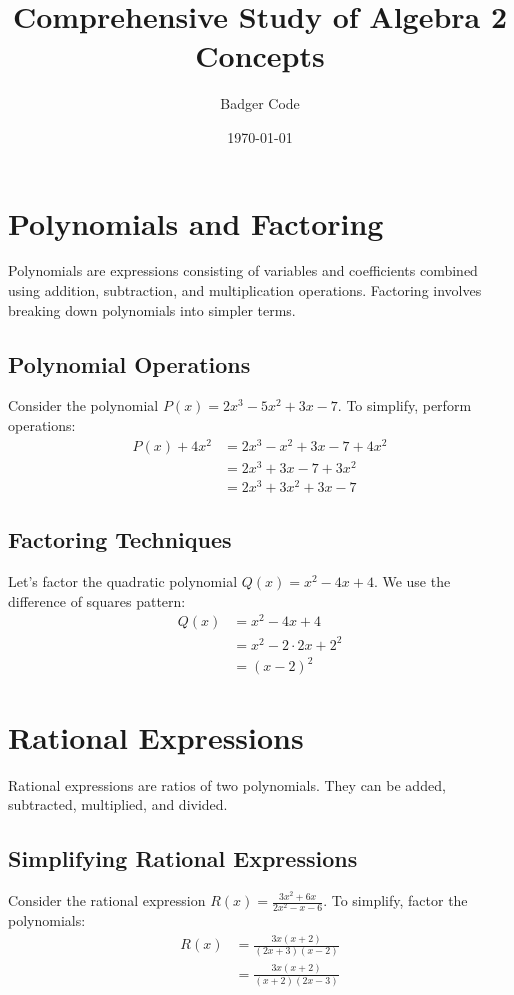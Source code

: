 \documentclass{article}
\title{Comprehensive Study of Algebra 2 Concepts}
\author{Badger Code}
\date{\today}
\begin{document}
\maketitle

\section{Polynomials and Factoring}
Polynomials are expressions consisting of variables and coefficients combined using addition, subtraction, and multiplication operations. Factoring involves breaking down polynomials into simpler terms.

\subsection{Polynomial Operations}
Consider the polynomial $P(x) = 2x^3 - 5x^2 + 3x - 7$. To simplify, perform operations:
\begin{align*}
    P(x) + 4x^2 &= 2x^3 - x^2 + 3x - 7 + 4x^2 \\
    &= 2x^3 + 3x - 7 + 3x^2 \\
    &= 2x^3 + 3x^2 + 3x - 7
\end{align*}

\subsection{Factoring Techniques}
Let's factor the quadratic polynomial $Q(x) = x^2 - 4x + 4$. We use the difference of squares pattern:
\begin{align*}
    Q(x) &= x^2 - 4x + 4 \\
    &= x^2 - 2 \cdot 2x + 2^2 \\
    &= (x - 2)^2
\end{align*}

\section{Rational Expressions}
Rational expressions are ratios of two polynomials. They can be added, subtracted, multiplied, and divided.

\subsection{Simplifying Rational Expressions}
Consider the rational expression $R(x) = \frac{3x^2 + 6x}{2x^2 - x - 6}$. To simplify, factor the polynomials:
\begin{align*}
    R(x) &= \frac{3x(x + 2)}{(2x + 3)(x - 2)} \\
    &= \frac{3x(x + 2)}{(x + 2)(2x - 3)}
\end{align*}
\end{document}
